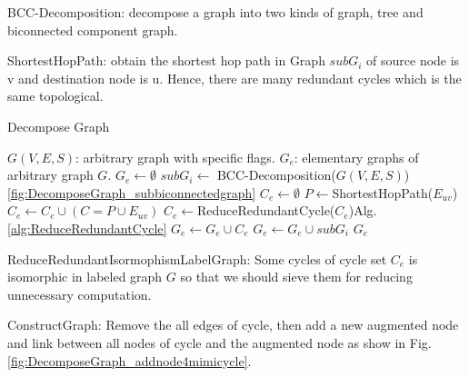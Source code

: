 BCC-Decomposition: decompose a graph into two kinds of graph, tree and biconnected component graph.

ShortestHopPath: obtain the shortest hop path in Graph $subG_i$ of source node is v and destination node is u. Hence, there are many redundant cycles which is the same topological.
\begin{algorithm}
\caption{Decompose Graph}
\label{alg:DecomposeGraph}
\begin{algorithmic}[1]
\REQUIRE $G(V,E,S)$: arbitrary graph with specific flags.
\ENSURE $G_e$: elementary graphs of arbitrary graph $G$.
\STATE $G_e\leftarrow \emptyset$
\STATE $subG_i\leftarrow$ BCC-Decomposition($G(V,E,S)$)\ref{fig:DecomposeGraph_subbiconnectedgraph}
\STATE $C_e\leftarrow \emptyset$
\STATE $P\leftarrow$ShortestHopPath($E_{uv}$)
\STATE $C_e\leftarrow C_e\cup(C=P\cup E_{uv})$
\ENDFOR
\STATE $C_e \leftarrow$ReduceRedundantCycle($C_e$)Alg.\ref{alg:ReduceRedundantCycle}
\STATE $G_e\leftarrow G_e\cup C_e$ %
\ELSE
\STATE $G_e\leftarrow G_e\cup subG_i$
\ENDIF
\RETURN $G_e$
\end{algorithmic}
\end{algorithm}


ReduceRedundantIsormophismLabelGraph: Some cycles of cycle set $C_e$ is isomorphic in labeled graph $G$ so that we should sieve them for reducing unnecessary computation.

ConstructGraph: Remove the all edges of cycle, then add a new augmented node and link between all nodes of cycle and the augmented node as show in Fig.\ref{fig:DecomposeGraph_addnode4mimicycle}.

